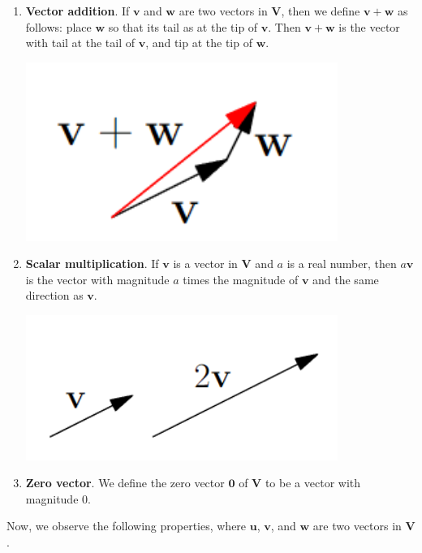 \documentclass{article}
\begin{document}
\begin{enumerate}
    \item \textbf{Vector addition}. If $\mathbf{v}$ and $\mathbf{w}$ are two vectors in $\mathbf{V}$, then we define $\mathbf{v}+\mathbf{w}$ as follows: place $\mathbf{w}$ so that its tail as at the tip of $\mathbf{v}$. Then $\mathbf{v}+\mathbf{w}$ is the vector with tail at the tail of $\mathbf{v}$, and tip at the tip of $\mathbf{w}$.

    \begin{center}
        \includegraphics[width=4in]{images/vector3.png}
    \end{center}

    \item \textbf{Scalar multiplication}. If $\mathbf{v}$ is a vector in $\mathbf{V}$ and $a$ is a real number, then $a\mathbf{v}$ is the vector with magnitude $a$ times the magnitude of $\mathbf{v}$ and the same direction as $\mathbf{v}$.

    \begin{center}
        \includegraphics[width=4in]{images/vector4.png}
    \end{center}

    \item \textbf{Zero vector}. We define the zero vector $\mathbf{0}$ of $\mathbf{V}$ to be a vector with magnitude $0$.
\end{enumerate}

Now, we observe the following properties, where $\mathbf{u}$, $\mathbf{v}$, and $\mathbf{w}$ are two vectors in $\mathbf{V}$.
\end{document}
